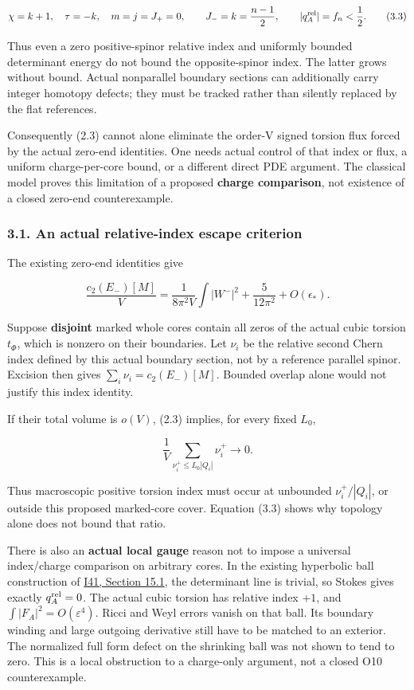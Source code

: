 \documentclass[
  11pt,
]{article}
\begin{document}
\[
 \chi=k+1,\quad\tau=-k,\quad m=j=J_+=0,
 \qquad J_-=k=\frac{n-1}{2},\qquad
 |q_A^{\rm rel}|=f_n<\frac12.
 \tag{3.3}
\]

Thus even a zero positive-spinor relative index and uniformly bounded
determinant energy do not bound the opposite-spinor index. The latter
grows without bound. Actual nonparallel boundary sections can
additionally carry integer homotopy defects; they must be tracked rather
than silently replaced by the flat references.

Consequently (2.3) cannot alone eliminate the order-V signed torsion
flux forced by the actual zero-end identities. One needs actual control
of that index or flux, a uniform charge-per-core bound, or a different
direct PDE argument. The classical model proves this limitation of a
proposed \textbf{charge comparison}, not existence of a closed zero-end
counterexample.

\hypertarget{an-actual-relative-index-escape-criterion}{%
\subsubsection{3.1. An actual relative-index escape
criterion}\label{an-actual-relative-index-escape-criterion}}

The existing zero-end identities give

\[
 \frac{c_2(E_-)[M]}V
   =\frac1{8\pi^2V}\int|W^-|^2
                      +\frac5{12\pi^2}+O(\epsilon_*).
 \tag{3.4}
\]

Suppose \textbf{disjoint} marked whole cores contain all zeros of the
actual cubic torsion \(t_\Phi\), which is nonzero on their boundaries.
Let \(\nu_i\) be the relative second Chern index defined by this actual
boundary section, not by a reference parallel spinor. Excision then
gives \(\sum_i\nu_i=c_2(E_-)[M]\). Bounded overlap alone would not
justify this index identity.

If their total volume is \(o(V)\), (2.3) implies, for every fixed
\(L_0\),

\[
 \frac1V\sum_{\nu_i^+\le L_0|Q_i|}\nu_i^+\longrightarrow0.
 \tag{3.5}
\]

Thus macroscopic positive torsion index must occur at unbounded
\(\nu_i^+/|Q_i|\), or outside this proposed marked-core cover. Equation
(3.3) shows why topology alone does not bound that ratio.

There is also an \textbf{actual local gauge} reason not to impose a
universal index/charge comparison on arbitrary cores. In the existing
hyperbolic ball construction of
\href{20260927_conformal_separation_and_zero_end.md}{I41, Section 15.1},
the determinant line is trivial, so Stokes gives exactly
\(q_A^{\rm rel}=0\). The actual cubic torsion has relative index \(+1\),
and \(\int|F_A|^2=O(\varepsilon^4)\). Ricci and Weyl errors vanish on
that ball. Its boundary winding and large outgoing derivative still have
to be matched to an exterior. The normalized full form defect on the
shrinking ball was not shown to tend to zero. This is a local
obstruction to a charge-only argument, not a closed O10 counterexample.
\end{document}
